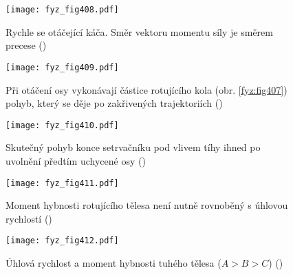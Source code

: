   \begin{figure}[ht!] %
    \centering
    \texttt{[image: fyz\_fig408.pdf]}
    \caption{Rychle se otáčející káča. Směr vektoru momentu síly je směrem precese 
             (\cite[s.~280]{Feynman01})}
    \label{fyz:fig408}
  \end{figure}

  \begin{figure}[ht!] %
    \centering
    \texttt{[image: fyz\_fig409.pdf]}
    \caption{Při otáčení osy vykonávají částice rotujícího kola (obr. \ref{fyz:fig407}) pohyb, 
             který se děje po zakřivených trajektoriích 
             (\cite[s.~280]{Feynman01})}
    \label{fyz:fig409}
  \end{figure}

  \begin{figure}[ht!] %
    \centering
    \texttt{[image: fyz\_fig410.pdf]}
    \caption{Skutečný pohyb konce setrvačníku pod vlivem tíhy ihned po uvolnění předtím uchycené osy
             (\cite[s.~281]{Feynman01})}
    \label{fyz:fig410}
  \end{figure}

  \begin{figure}[ht!] %
    \centering
    \texttt{[image: fyz\_fig411.pdf]}
    \caption{Moment hybnosti rotujícího tělesa není nutně rovnoběný s úhlovou rychlostí
             (\cite[s.~282]{Feynman01})}
    \label{fyz:fig411}
  \end{figure}

  \begin{figure}[ht!] %
    \centering
    \texttt{[image: fyz\_fig412.pdf]}
    \caption{Úhlová rychlost a moment hybnosti tuhého tělesa (\(A>B>C\))
             (\cite[s.~283]{Feynman01})}
    \label{fyz:fig412}
  \end{figure}

